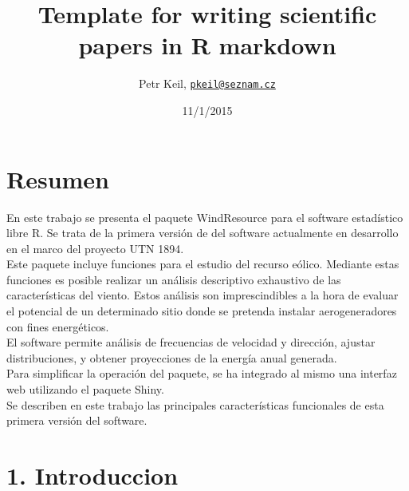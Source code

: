 \documentclass[]{article}
\title{Template for writing scientific papers in R markdown}
\author{Petr Keil, \href{mailto:pkeil@seznam.cz}{\nolinkurl{pkeil@seznam.cz}}}
\date{11/1/2015}
\begin{document}
\maketitle


\section{Resumen}\label{resumen}

En este trabajo se presenta el paquete WindResource para el software
estadístico libre R. Se trata de la primera versión de del software
actualmente en desarrollo en el marco del proyecto UTN 1894.\\Este
paquete incluye funciones para el estudio del recurso eólico. Mediante
estas funciones es posible realizar un análisis descriptivo exhaustivo
de las características del viento. Estos análisis son imprescindibles a
la hora de evaluar el potencial de un determinado sitio donde se
pretenda instalar aerogeneradores con fines energéticos.\\El software
permite análisis de frecuencias de velocidad y dirección, ajustar
distribuciones, y obtener proyecciones de la energía anual
generada.\\Para simplificar la operación del paquete, se ha integrado al
mismo una interfaz web utilizando el paquete Shiny.\\Se describen en
este trabajo las principales características funcionales de esta primera
versión del software.

\section{1. Introduccion}\label{introduccion}
\end{document}

